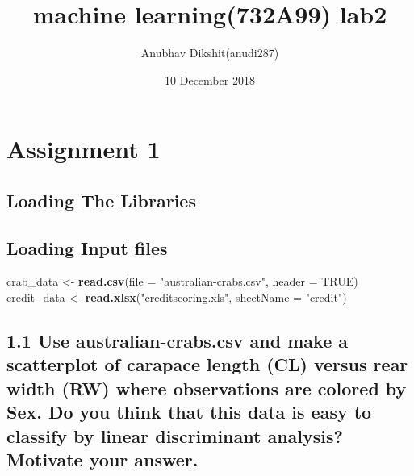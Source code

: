 \documentclass[]{article}
\title{machine learning(732A99) lab2}
\author{Anubhav Dikshit(anudi287)}
\date{10 December 2018}
\newenvironment{Shaded}{\begin{snugshade}}{\end{snugshade}}
\newcommand{\KeywordTok}[1]{\textcolor[rgb]{0.13,0.29,0.53}{\textbf{#1}}}
\newcommand{\DataTypeTok}[1]{\textcolor[rgb]{0.13,0.29,0.53}{#1}}
\newcommand{\StringTok}[1]{\textcolor[rgb]{0.31,0.60,0.02}{#1}}
\newcommand{\OtherTok}[1]{\textcolor[rgb]{0.56,0.35,0.01}{#1}}
\newcommand{\NormalTok}[1]{#1}
\begin{document}
\maketitle

{
\setcounter{tocdepth}{2}
\tableofcontents
}
\newpage

\section{Assignment 1}\label{assignment-1}

\subsection{Loading The Libraries}\label{loading-the-libraries}

\subsection{Loading Input files}\label{loading-input-files}

\begin{Shaded}
\begin{Highlighting}[]
\NormalTok{crab_data <-}\StringTok{ }\KeywordTok{read.csv}\NormalTok{(}\DataTypeTok{file =} \StringTok{"australian-crabs.csv"}\NormalTok{, }\DataTypeTok{header =} \OtherTok{TRUE}\NormalTok{)}
\NormalTok{credit_data <-}\StringTok{ }\KeywordTok{read.xlsx}\NormalTok{(}\StringTok{"creditscoring.xls"}\NormalTok{, }\DataTypeTok{sheetName =} \StringTok{"credit"}\NormalTok{)}
\end{Highlighting}
\end{Shaded}

\subsection{1.1 Use australian-crabs.csv and make a scatterplot of
carapace length (CL) versus rear width (RW) where observations are
colored by Sex. Do you think that this data is easy to classify by
linear discriminant analysis? Motivate your
answer.}\label{use-australian-crabs.csv-and-make-a-scatterplot-of-carapace-length-cl-versus-rear-width-rw-where-observations-are-colored-by-sex.-do-you-think-that-this-data-is-easy-to-classify-by-linear-discriminant-analysis-motivate-your-answer.}
\end{document}
